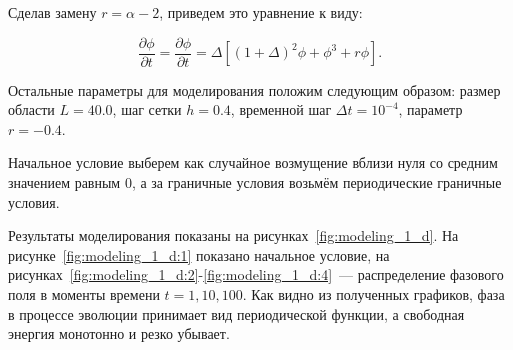 Сделав замену $r = \alpha -2$, приведем это уравнение к виду:

\begin{equation*}
    \frac{\partial \phi}{\partial t} = \frac{\partial \phi}{\partial t} = \Delta\left[
    (1 + \Delta)^2 \phi + \phi^3 + r \phi\right].
\end{equation*}

\label{parametrs1}
Остальные параметры для моделирования положим следующим образом: размер области $L = 40.0$, шаг сетки $\displaystyle h = 0.4$, временной шаг $\displaystyle \Delta t = 10^{-4}$, параметр $r = -0.4$.

Начальное условие выберем как случайное возмущение вблизи нуля со средним значением равным 0, а за граничные условия возьмём периодические граничные условия.

Результаты моделирования показаны на рисунках~\ref{fig:modeling_1_d}. На рисунке~\ref{fig:modeling_1_d:1} показано начальное условие, на рисунках~\ref{fig:modeling_1_d:2}-\ref{fig:modeling_1_d:4}~--- распределение фазового поля в моменты времени $t = 1, 10, 100$. Как видно из полученных графиков, фаза в процессе эволюции принимает вид периодической функции, а свободная энергия монотонно и резко убывает.

